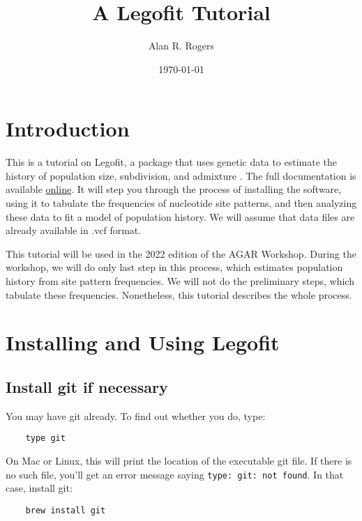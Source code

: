 \documentclass[11pt]{article}
\begin{document}
\title{A Legofit Tutorial}
\author{Alan R. Rogers}
\date{\today}
\maketitle

\section{Introduction}
This is a tutorial on Legofit, a package that uses genetic data to
estimate the history of population size, subdivision, and admixture
\citep{Rogers:BMC-20-526, Rogers:PCJ-2-e32}. The full documentation is
available
\href{http://alanrogers.github.io/legofit/html/index.html}{online}. It
will step you through the process of installing the software, using it
to tabulate the frequencies of nucleotide site patterns, and then
analyzing these data to fit a model of population history. We will
assume that data files are already available in .vcf format.

This tutorial will be used in the 2022 edition of the AGAR
Workshop. During the workshop, we will do only last step in this
process, which estimates population history from site pattern
frequencies. We will not do the preliminary steps, which tabulate
these frequencies. Nonetheless, this tutorial describes the whole
process.

\section{Installing and Using Legofit}
\subsection{Install git if necessary}
You may have git already. To find out whether you do, type:
\begin{verbatim}
    type git
\end{verbatim}
On Mac or Linux, this will print the location of the executable git
file. If there is no such file, you'll get an error message saying
\texttt{type: git: not found}. In that case, install git:
\begin{verbatim}
    brew install git
\end{verbatim}
\end{document}
